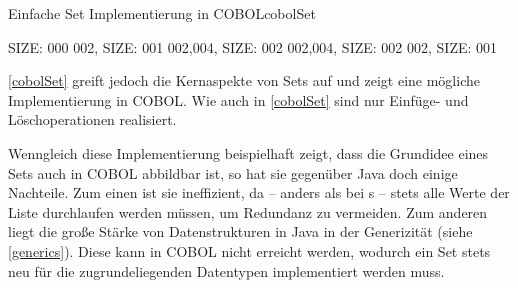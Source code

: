 \begin{codeWithCaption}{Einfache Set Implementierung in COBOL}{cobolSet}
\begin{shellwindow}
 SIZE: 000
002, SIZE: 001
002,004, SIZE: 002
002,004, SIZE: 002
002, SIZE: 001
\end{shellwindow}
\end{codeWithCaption}

\autoref{cobolSet} greift jedoch die Kernaspekte von Sets auf und zeigt eine mögliche Implementierung in COBOL. Wie auch in \autoref{cobolSet} sind nur Einfüge- und Löschoperationen realisiert. 

Wenngleich diese Implementierung beispielhaft zeigt, dass die Grundidee eines Sets auch in COBOL abbildbar ist, so hat sie gegenüber Java doch einige Nachteile. Zum einen ist sie ineffizient, da -- anders als bei s -- stets alle Werte der Liste durchlaufen werden müssen, um Redundanz zu vermeiden. Zum anderen liegt die große Stärke von Datenstrukturen in Java in der Generizität (siehe \autoref{generics}). Diese kann in COBOL nicht erreicht werden, wodurch ein Set stets neu für die zugrundeliegenden Datentypen implementiert werden muss.